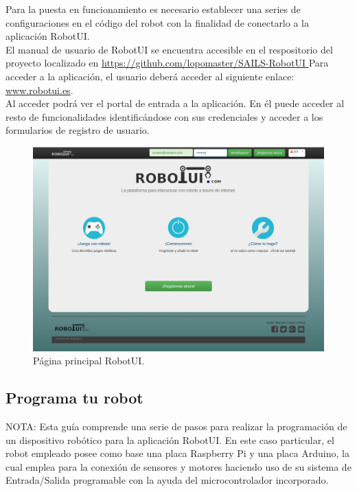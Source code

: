 Para la puesta en funcionamiento es necesario establecer una series de configuraciones en el código del robot con la finalidad de conectarlo a la aplicación RobotUI.\\

El manual de usuario de RobotUI se encuentra accesible en el respositorio del proyecto localizado en \url{ https://github.com/lopomaster/SAILS-RobotUI }
Para acceder a la aplicación, el usuario deberá acceder al siguiente enlace: \url{www.robotui.es}. \\

Al acceder podrá ver el portal de entrada a la aplicación. En él puede acceder al resto de funcionalidades identificándose con sus credenciales y acceder a los formularios de registro
de usuario.\\

\begin{figure}[H]
  \begin{center}
    \includegraphics[scale=0.3]{imagenes/manual-usuario/pagina-principal.png}
  \end{center}
  \caption{Página principal RobotUI.}
  \label{website:pagina-principal}
\end{figure}


\subsection{ Programa tu robot }
\label{sec:programacion-robot}

NOTA: Esta guía comprende una serie de pasos para realizar la programación de un dispositivo robótico para la aplicación RobotUI. En este caso particular, el robot empleado posee
como base una placa Raspberry Pi y una placa Arduino, la cual emplea para la conexión de sensores y motores haciendo uso de su sistema de Entrada/Salida programable con la ayuda del 
microcontrolador incorporado.\\

